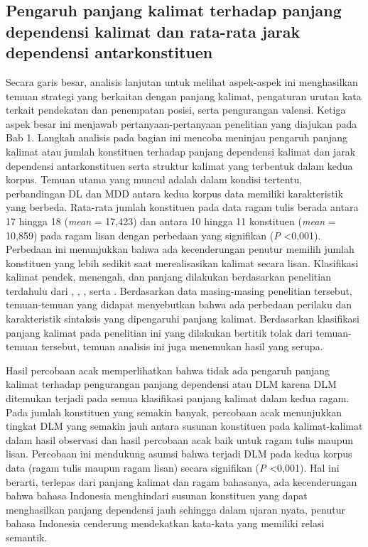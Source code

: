\subsection{Pengaruh panjang kalimat terhadap panjang dependensi kalimat dan rata-rata jarak dependensi antarkonstituen}
Secara garis besar, analisis lanjutan untuk melihat aspek-aspek ini menghasilkan temuan strategi yang berkaitan dengan panjang kalimat, pengaturan urutan kata terkait pendekatan dan penempatan posisi, serta pengurangan valensi. Ketiga aspek besar ini menjawab pertanyaan-pertanyaan penelitian yang diajukan pada Bab 1. Langkah analisis pada bagian ini mencoba meninjau pengaruh panjang kalimat atau jumlah konstituen terhadap panjang dependensi kalimat dan jarak dependensi antarkonstituen serta struktur kalimat yang terbentuk dalam kedua korpus. Temuan utama yang muncul adalah dalam kondisi tertentu, perbandingan DL dan MDD antara kedua korpus data memiliki karakteristik yang berbeda. Rata-rata jumlah konstituen pada data ragam tulis berada antara 17 hingga 18 (\textit{mean} = 17,423) dan antara 10 hingga 11 konstituen (\textit{mean} = 10,859) pada ragam lisan dengan perbedaan yang signifikan (\textit{P} \textless 0,001). Perbedaan ini menunjukkan bahwa ada kecenderungan penutur memilih jumlah konstituen yang lebih sedikit saat merealisasikan kalimat secara lisan. Klasifikasi kalimat pendek, menengah, dan panjang dilakukan berdasarkan penelitian terdahulu dari \cite{gildea2015human}, \cite{futrell2015large}, \cite{wang2017effects}, serta \cite{liu2017dependency}. Berdasarkan data masing-masing penelitian tersebut, temuan-temuan yang didapat menyebutkan bahwa ada perbedaan perilaku dan karakteristik sintaksis yang dipengaruhi panjang kalimat. Berdasarkan klasifikasi panjang kalimat pada penelitian ini yang dilakukan bertitik tolak dari temuan-temuan tersebut, temuan analisis ini juga menemukan hasil yang serupa. 

Hasil percobaan acak memperlihatkan bahwa tidak ada pengaruh panjang kalimat terhadap pengurangan panjang dependensi atau DLM karena DLM ditemukan terjadi pada semua klasifikasi panjang kalimat dalam kedua ragam. Pada jumlah konstituen yang semakin banyak, percobaan acak menunjukkan tingkat DLM yang semakin jauh antara susunan konstituen pada kalimat-kalimat dalam hasil observasi dan hasil percobaan acak baik untuk ragam tulis maupun lisan. Percobaan ini mendukung asumsi bahwa terjadi DLM pada kedua korpus data (ragam tulis maupun ragam lisan) secara signifikan (\textit{P} \textless 0,001). Hal ini berarti, terlepas dari panjang kalimat dan ragam bahasanya, ada kecenderungan bahwa bahasa Indonesia menghindari susunan konstituen yang dapat menghasilkan panjang dependensi jauh sehingga dalam ujaran nyata, penutur bahasa Indonesia cenderung mendekatkan kata-kata yang memiliki relasi semantik.

